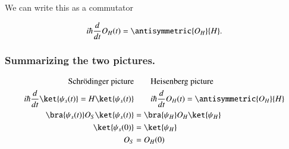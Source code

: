 We can write this as a commutator

\begin{equation}\label{eqn:qmTwoL5:380}
i \hbar \frac{d}{dt} O_H(t) = \antisymmetric{O_H}{H}.
\end{equation}

\subsubsection{Summarizing the two pictures.}

\begin{align*}
\text{Schr\"{o}dinger picture} &\qquad \text{Heisenberg picture} \\
i \hbar \frac{d}{dt} \ket{\psi_s(t)} = H \ket{\psi_s(t)} &\qquad i \hbar \frac{d}{dt} O_H(t) = \antisymmetric{O_H}{H} \\
\bra{\psi_s(t)} O_S \ket{\psi_s(t)} &= \bra{\psi_H} O_H \ket{\psi_H} \\
\ket{\psi_s(0)} &= \ket{\psi_H} \\
O_S &= O_H(0)
\end{align*}

\EndArticle

